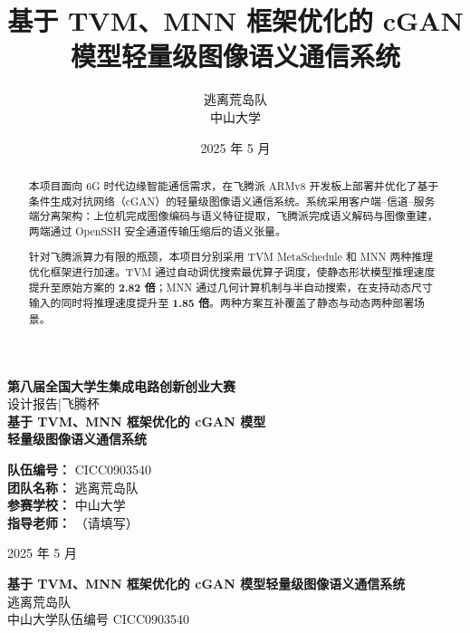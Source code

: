 \documentclass[lang=cn,a4paper,newtx,citestyle=gb7714-2015,bibstyle=gb7714-2015]{elegantpaper}
\title{基于 TVM、MNN 框架优化的 cGAN 模型轻量级图像语义通信系统}
\author{逃离荒岛队 \\ 中山大学}
\institute{第八届全国大学生集成电路创新创业大赛\enspace·\enspace 飞腾杯}
\date{2025 年 5 月}
\begin{document}
\begin{titlepage}
\centering
\vspace*{1.5cm}

{\LARGE\bfseries 第八届全国大学生集成电路创新创业大赛}\\[0.8cm]
{\Large 设计报告\enspace|\enspace 飞腾杯}\\[2.0cm]

{\huge\bfseries 基于 TVM、MNN 框架优化的 cGAN 模型\\[0.4cm]
轻量级图像语义通信系统}\\[1.5cm]

\begin{flushleft}
\large
\hspace{3cm}\textbf{队伍编号：} CICC0903540\\[0.35cm]
\hspace{3cm}\textbf{团队名称：} 逃离荒岛队\\[0.35cm]
\hspace{3cm}\textbf{参赛学校：} 中山大学\\[0.35cm]
\hspace{3cm}\textbf{指导老师：} （请填写）\\[0.35cm]
\end{flushleft}

\vfill
{\large 2025 年 5 月}
\end{titlepage}

\tableofcontents
\newpage

\begin{center}
{\Large\bfseries 基于 TVM、MNN 框架优化的 cGAN 模型轻量级图像语义通信系统}\\[0.6cm]
{\large 逃离荒岛队}\\[0.2cm]
{\normalsize 中山大学\quad 队伍编号 CICC0903540}\\[0.5cm]
\end{center}

\begin{abstract}
\noindent 本项目面向 6G 时代边缘智能通信需求，在飞腾派 ARMv8 开发板上部署并优化了基于条件生成对抗网络（cGAN）的轻量级图像语义通信系统。系统采用客户端--信道--服务端分离架构：上位机完成图像编码与语义特征提取，飞腾派完成语义解码与图像重建，两端通过 OpenSSH 安全通道传输压缩后的语义张量。

\noindent 针对飞腾派算力有限的瓶颈，本项目分别采用 TVM MetaSchedule 和 MNN 两种推理优化框架进行加速。TVM 通过自动调优搜索最优算子调度，使静态形状模型推理速度提升至原始方案的 \textbf{2.82 倍}；MNN 通过几何计算机制与半自动搜索，在支持动态尺寸输入的同时将推理速度提升至 \textbf{1.85 倍}。两种方案互补覆盖了静态与动态两种部署场景。

\end{abstract}
\end{document}
